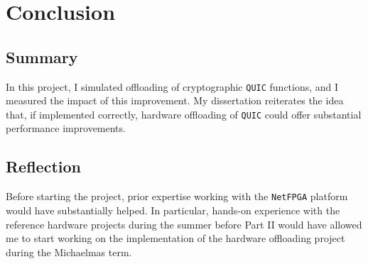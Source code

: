 \documentclass[12pt,a4paper]{report}
\newcommand\note[2]{{\color{#1}\bf #2}}
\newcommand\simon[1]{\ifcomments{\note{cyan}{SM: #1}}\fi}
\begin{document}







\chapter{Conclusion}



\section{Summary}

In this project, I simulated offloading of cryptographic \texttt{QUIC} functions, and I measured the impact of this improvement.
My dissertation reiterates the idea that, if implemented correctly, hardware offloading of \texttt{QUIC} could offer substantial performance improvements.


\section{Reflection}
Before starting the project, prior expertise working with the \texttt{NetFPGA} platform would have substantially helped.
In particular, hands-on experience with the reference hardware projects during the summer before Part II would have allowed me to start working on the implementation of the hardware offloading project during the Michaelmas term.
\end{document}

